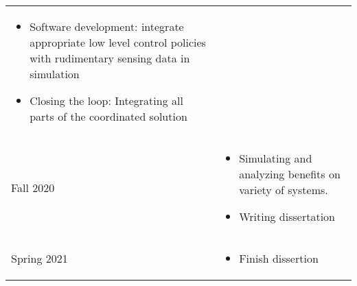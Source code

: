 \documentclass[12pt]{article}
\begin{document}
\begin{center}
\begin{tabular}{ | p{3cm} | p{11cm} |}
\begin{itemize}
    	\item Software development: integrate appropriate low level control policies with rudimentary sensing data in simulation
    	\item Closing the loop: Integrating all parts of the coordinated solution
	\end{itemize}\\
	    Fall 2020 & 
    \begin{itemize}
    	\item Simulating and analyzing benefits on variety of systems. 
    	\item Writing dissertation
	\end{itemize}\\
	    Spring 2021 & 
    \begin{itemize}
    	\item Finish dissertion
	\end{itemize}\\

    \hline
    \end{tabular}
\end{center}
\end{document}

